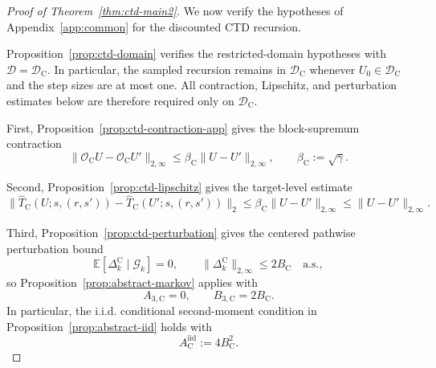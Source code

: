 \documentclass{article}
\begin{document}
\begin{proof}[Proof of Theorem~\ref{thm:ctd-main2}]
We now verify the hypotheses of Appendix~\ref{app:common} for the discounted CTD recursion.

Proposition~\ref{prop:ctd-domain} verifies the restricted-domain hypotheses with $\mathcal D=\mathcal D_{\mathrm C}$. In particular, the sampled recursion remains in $\mathcal D_{\mathrm C}$ whenever $U_0\in\mathcal D_{\mathrm C}$ and the step sizes are at most one. All contraction, Lipschitz, and perturbation estimates below are therefore required only on $\mathcal D_{\mathrm C}$.

First, Proposition~\ref{prop:ctd-contraction-app} gives the block-supremum contraction
\begin{equation}
\lVert \mathcal O_{\mathrm C} U - \mathcal O_{\mathrm C} U' \rVert_{2,\infty} \le \beta_{\mathrm C} \lVert U-U' \rVert_{2,\infty}, \qquad \beta_{\mathrm C} := \sqrt{\gamma}.
\end{equation}

Second, Proposition~\ref{prop:ctd-lipschitz} gives the target-level estimate
\begin{equation}
\lVert \widehat T_{\mathrm C}(U;s,(r,s')) - \widehat T_{\mathrm C}(U';s,(r,s')) \rVert_2 \le \beta_{\mathrm C} \lVert U-U' \rVert_{2,\infty} \le \lVert U-U' \rVert_{2,\infty}.
\end{equation}

Third, Proposition~\ref{prop:ctd-perturbation} gives the centered pathwise perturbation bound
\begin{equation}
\mathbb{E}[\Delta_k^{\mathrm C} \mid \mathcal G_k] = 0, \qquad \lVert \Delta_k^{\mathrm C} \rVert_{2,\infty} \le 2B_{\mathrm C} \quad \text{a.s.},
\end{equation}
so Proposition~\ref{prop:abstract-markov} applies with
\begin{equation}
A_{3,\mathrm C}=0,\qquad B_{3,\mathrm C}=2B_{\mathrm C}.
\end{equation}
In particular, the i.i.d. conditional second-moment condition in Proposition~\ref{prop:abstract-iid} holds with
\begin{equation}
A_{\mathrm C}^{\mathrm{iid}} := 4B_{\mathrm C}^2.
\end{equation}


\end{proof}
\end{document}
